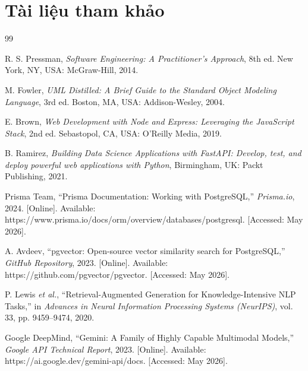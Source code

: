 \section{Tài liệu tham khảo}
\renewcommand{\refname}{} %

\begin{thebibliography}{99}

R. S. Pressman, \emph{Software Engineering: A Practitioner's Approach}, 8th ed. New York, NY, USA: McGraw-Hill, 2014.

M. Fowler, \emph{UML Distilled: A Brief Guide to the Standard Object Modeling Language}, 3rd ed. Boston, MA, USA: Addison-Wesley, 2004.

E. Brown, \emph{Web Development with Node and Express: Leveraging the JavaScript Stack}, 2nd ed. Sebastopol, CA, USA: O'Reilly Media, 2019.

B. Ramirez, \emph{Building Data Science Applications with FastAPI: Develop, test, and deploy powerful web applications with Python}, Birmingham, UK: Packt Publishing, 2021.

Prisma Team, ``Prisma Documentation: Working with PostgreSQL,'' \emph{Prisma.io}, 2024. [Online]. Available: https://www.prisma.io/docs/orm/overview/databases/postgresql. [Accessed: May 2026].

A. Avdeev, ``pgvector: Open-source vector similarity search for PostgreSQL,'' \emph{GitHub Repository}, 2023. [Online]. Available: https://github.com/pgvector/pgvector. [Accessed: May 2026].

P. Lewis \emph{et al.}, ``Retrieval-Augmented Generation for Knowledge-Intensive NLP Tasks,'' in \emph{Advances in Neural Information Processing Systems (NeurIPS)}, vol. 33, pp. 9459--9474, 2020.

Google DeepMind, ``Gemini: A Family of Highly Capable Multimodal Models,'' \emph{Google API Technical Report}, 2023. [Online]. Available: https://ai.google.dev/gemini-api/docs. [Accessed: May 2026].

\end{thebibliography}


